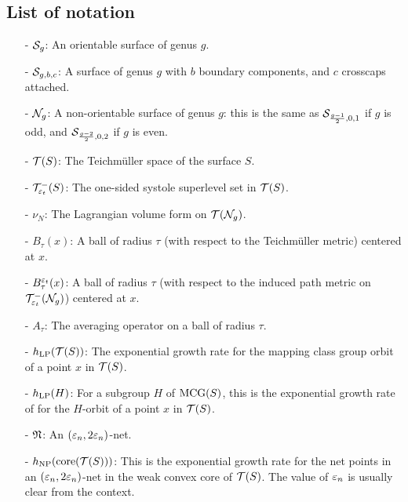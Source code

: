 


\subsection*{List of notation}
\begin{itemize}
\item[-] $\mathcal{S}_g$: An orientable surface of genus $g$.
\item[-] $\mathcal{S}_{g,b,c}$: A surface of genus $g$ with $b$ boundary components, and $c$ crosscaps attached.
\item[-] $\mathcal{N}_g$: A non-orientable surface of genus $g$: this is the same as $\mathcal{S}_{\frac{g-1}{2}, 0, 1}$ if $g$ is odd, and $\mathcal{S}_{\frac{g-2}{2}, 0, 2}$ if $g$ is even.
\item[-] $\mathcal{T}(S)$: The Teichmüller space of the surface $S$.
\item[-] $\mathcal{T}_{\varepsilon_t}^{-}(S)$: The one-sided systole superlevel set in $\mathcal{T}(S)$.
\item[-] $\nu_N$: The Lagrangian volume form on $\mathcal{T}(\mathcal{N}_g)$.
\item[-] $B_{\tau}(x)$: A ball of radius $\tau$ (with respect to the Teichmüller metric) centered at $x$.
\item[-] $B_{\tau}^{\varepsilon_t}(x)$: A ball of radius $\tau$ (with respect to the induced path metric on $\mathcal{T}_{\varepsilon_t}^{-}(\mathcal{N}_g)$) centered at $x$.
\item[-] $A_{\tau}$: The averaging operator on a ball of radius $\tau$.
\item[-] $h_{\mathrm{LP}}(\mathcal{T}(S))$: The exponential growth rate for the mapping class group orbit of a point $x$ in $\mathcal{T}(S)$.
\item[-] $h_{\mathrm{LP}}(H)$: For a subgroup $H$ of $\mathrm{MCG}(S)$, this is the exponential growth rate of for the $H$-orbit of a point $x$ in $\mathcal{T}(S)$.
\item[-] $\mathfrak{N}$: An $(\varepsilon_n, 2\varepsilon_n)$-net.
\item[-] $h_{\mathrm{NP}}(\mathrm{core}(\mathcal{T}(S)))$: This is the exponential growth rate for the net points in an $(\varepsilon_n, 2 \varepsilon_n)$-net in the weak convex core of $\mathcal{T}(S)$. The value of $\varepsilon_n$ is usually clear from the context.

\end{itemize}
